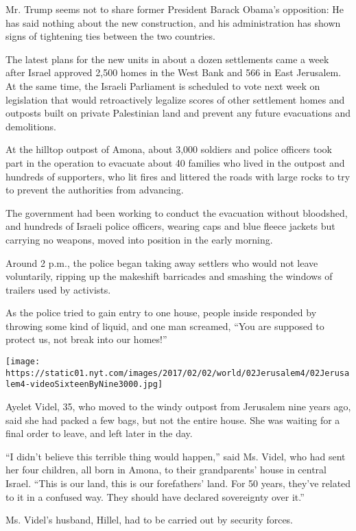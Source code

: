 Mr. Trump seems not to share former President Barack Obama's opposition:
He has said nothing about the new construction, and his administration
has shown signs of tightening ties between the two countries.

The latest plans for the new units in about a dozen settlements came a
week after Israel approved 2,500 homes in the West Bank and 566 in East
Jerusalem. At the same time, the Israeli Parliament is scheduled to vote
next week on legislation that would retroactively legalize scores of
other settlement homes and outposts built on private Palestinian land
and prevent any future evacuations and demolitions.

At the hilltop outpost of Amona, about 3,000 soldiers and police
officers took part in the operation to evacuate about 40 families who
lived in the outpost and hundreds of supporters, who lit fires and
littered the roads with large rocks to try to prevent the authorities
from advancing.

The government had been working to conduct the evacuation without
bloodshed, and hundreds of Israeli police officers, wearing caps and
blue fleece jackets but carrying no weapons, moved into position in the
early morning.

Around 2 p.m., the police began taking away settlers who would not leave
voluntarily, ripping up the makeshift barricades and smashing the
windows of trailers used by activists.

As the police tried to gain entry to one house, people inside responded
by throwing some kind of liquid, and one man screamed, ``You are
supposed to protect us, not break into our homes!''

\texttt{[image: https://static01.nyt.com/images/2017/02/02/world/02Jerusalem4/02Jerusalem4-videoSixteenByNine3000.jpg]}

Ayelet Videl, 35, who moved to the windy outpost from Jerusalem nine
years ago, said she had packed a few bags, but not the entire house. She
was waiting for a final order to leave, and left later in the day.

``I didn't believe this terrible thing would happen,'' said Ms. Videl,
who had sent her four children, all born in Amona, to their
grandparents' house in central Israel. ``This is our land, this is our
forefathers' land. For 50 years, they've related to it in a confused
way. They should have declared sovereignty over it.''

Ms. Videl's husband, Hillel, had to be carried out by security forces.

